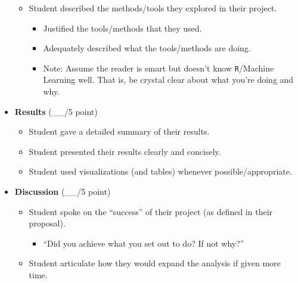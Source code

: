 \documentclass[
  11pt,
]{article}
\providecommand{\tightlist}{%
  \setlength{\itemsep}{0pt}\setlength{\parskip}{0pt}}
\begin{document}
\begin{itemize}
  \begin{itemize}
  \tightlist
  \item
    Student described the methods/tools they explored in their project.

    \begin{itemize}
    \tightlist
    \item
      Justified the tools/methods that they used.
    \item
      Adequately described what the tools/methods are doing.
    \item
      Note: Assume the reader is smart but doesn't know
      \texttt{R}/Machine Learning well. That is, be crystal clear about
      what you're doing and why.
    \end{itemize}
  \end{itemize}
\item
  \textbf{Results} (\_\_/5 point)

  \begin{itemize}
  \item
    Student gave a detailed summary of their results.
  \item
    Student presented their results clearly and concisely.
  \item
    Student used visualizations (and tables) whenever
    possible/appropriate.
  \end{itemize}
\item
  \textbf{Discussion} (\_\_/5 point)

  \begin{itemize}
  \tightlist
  \item
    Student spoke on the ``success'' of their project (as defined in
    their proposal).

    \begin{itemize}
    \tightlist
    \item
      ``Did you achieve what you set out to do? If not why?''
    \end{itemize}
  \item
    Student articulate how they would expand the analysis if given more
    time.
  \end{itemize}
\end{itemize}
\end{document}
